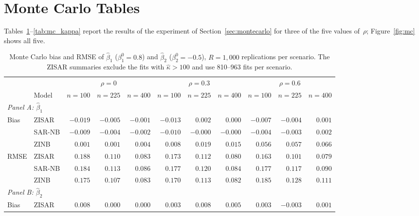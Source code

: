 \section{Monte Carlo Tables}\label{app:mc}

Tables~\ref{tab:mc_beta}--\ref{tab:mc_kappa} report the results of the experiment of Section~\ref{sec:montecarlo} for three of the five values of~$\rho$; Figure~\ref{fig:mc} shows all five.

\begin{table}[htbp]
\centering
\caption{Monte Carlo bias and RMSE of $\hat{\beta}_1$ ($\beta_1^0 = 0.8$) and $\hat{\beta}_2$ ($\beta_2^0 = -0.5$), $R=1{,}000$ replications per scenario. The ZISAR summaries exclude the fits with $\hat\kappa > 100$ and use 810--963 fits per scenario.}\label{tab:mc_beta}
\footnotesize
\setlength{\tabcolsep}{4pt}
\begin{tabular}{ll rrr rrr rrr}
\toprule
& & \multicolumn{3}{c}{$\rho=0$} & \multicolumn{3}{c}{$\rho=0.3$} & \multicolumn{3}{c}{$\rho=0.6$} \\
\cmidrule(lr){3-5}\cmidrule(lr){6-8}\cmidrule(lr){9-11}
& Model & $n{=}100$ & $n{=}225$ & $n{=}400$ & $n{=}100$ & $n{=}225$ & $n{=}400$ & $n{=}100$ & $n{=}225$ & $n{=}400$ \\
\midrule
\multicolumn{11}{l}{\emph{Panel A: $\hat{\beta}_1$}} \\[3pt]
\multirow{3}{*}{Bias}
  & ZISAR    & $-0.019$ & $-0.005$ & $-0.001$ & $-0.013$ & $0.002$ & $0.000$ & $-0.007$ & $-0.004$ & $0.001$ \\
  & SAR-NB   & $-0.009$ & $-0.004$ & $-0.002$ & $-0.010$ & $-0.000$ & $-0.000$ & $-0.004$ & $-0.003$ & $0.002$ \\
  & ZINB     & $0.001$ & $0.001$ & $0.004$ & $0.008$ & $0.019$ & $0.015$ & $0.056$ & $0.057$ & $0.066$ \\
[3pt]
\multirow{3}{*}{RMSE}
  & ZISAR    & $0.188$ & $0.110$ & $0.083$ & $0.173$ & $0.112$ & $0.080$ & $0.163$ & $0.101$ & $0.079$ \\
  & SAR-NB   & $0.184$ & $0.113$ & $0.086$ & $0.177$ & $0.120$ & $0.084$ & $0.177$ & $0.117$ & $0.090$ \\
  & ZINB     & $0.175$ & $0.107$ & $0.083$ & $0.170$ & $0.113$ & $0.082$ & $0.185$ & $0.128$ & $0.111$ \\
\midrule
\multicolumn{11}{l}{\emph{Panel B: $\hat{\beta}_2$}} \\[3pt]
\multirow{3}{*}{Bias}
  & ZISAR    & $0.008$ & $0.000$ & $0.000$ & $0.003$ & $0.008$ & $0.005$ & $0.003$ & $-0.003$ & $0.001$ \\

\end{tabular}
\end{table}
